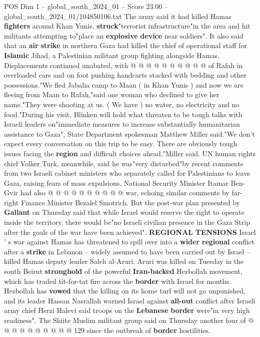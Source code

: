 \begin{textsample}{POS Dim 1 – global\_south\_2024\_01 – Score 23.00 – global\_south\_2024\_01/104850106.txt}
The army said it had killed Hamas \textbf{fighters} around Khan Yunis, \textbf{struck}"terrorist infrastructure"in the area and hit militants attempting to"place an \textbf{explosive} \textbf{device} near soldiers".
It also said that an \textbf{air} \textbf{strike} in northern Gaza had killed the chief of operational staff for \textbf{Islamic} Jihad, a Palestinian militant group fighting alongside Hamas.
Displacements continued unabated, with @ @ @ @ @ @ @ @ @ @ of Rafah in overloaded cars and on foot pushing handcarts stacked with bedding and other possessions."We fled Jabalia camp to Maan ( in Khan Yunis ) and now we are fleeing from Maan to Rafah,"said one woman who declined to give her name."They were shooting at us. ( We have ) no water, no electricity and no food."During his visit, Blinken will hold what threaten to be tough talks with Israeli leaders on"immediate measures to increase substantially humanitarian assistance to Gaza", State Department spokesman Matthew Miller said."We don't expect every conversation on this trip to be easy.
There are obviously tough issues facing the \textbf{region} and difficult choices ahead,"Miller said.
UN human rights chief Volker Turk, meanwhile, said he was"very disturbed"by recent comments from two Israeli cabinet ministers who separately called for Palestinians to leave Gaza, raising fears of mass expulsions.
National Security Minister Itamar Ben-Gvir had also @ @ @ @ @ @ @ @ @ @ war, echoing similar comments by far-right Finance Minister Bezalel Smotrich.
But the post-war plan presented by \textbf{Gallant} on Thursday said that while Israel would reserve the right to operate inside the territory, there would be"no Israeli civilian presence in the Gaza Strip after the goals of the war have been achieved". \textbf{REGIONAL} \textbf{TENSIONS} Israel ' s war against Hamas has threatened to spill over into a \textbf{wider} \textbf{regional} conflict after a \textbf{strike} in Lebanon -- widely assumed to have been carried out by Israel -- killed Hamas deputy leader Saleh al-Aruri.
Aruri was killed on Tuesday in the south Beirut \textbf{stronghold} of the powerful \textbf{Iran-backed} Hezbollah movement, which has traded tit-for-tat fire across the \textbf{border} with Israel for months.
Hezbollah has \textbf{vowed} that the killing on its home turf will not go unpunished, and its leader Hassan Nasrallah warned Israel against \textbf{all-out} conflict after Israeli army chief Herzi Halevi said troops on the \textbf{Lebanese} \textbf{border} were"in very high readiness".
The Shiite Muslim militant group said on Thursday another four of @ @ @ @ @ @ @ @ @ @ 129 since the outbreak of \textbf{border} hostilities.

\end{textsample}
